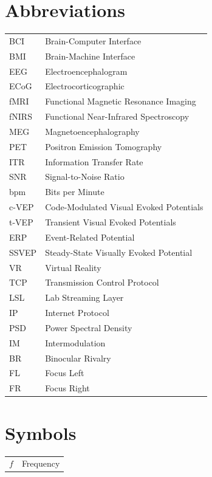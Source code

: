 \documentclass[master=eaict]{kulemt}
\begin{document}
\section*{Abbreviations}
\begin{flushleft}
  \renewcommand{\arraystretch}{1.1}
  \begin{tabularx}{\textwidth}{@{}p{12mm}X@{}}
    BCI & Brain-Computer Interface \\
    BMI & Brain-Machine Interface \\
    EEG & Electroencephalogram \\
    ECoG & Electrocorticographic \\
    fMRI & Functional Magnetic Resonance Imaging \\
    fNIRS & Functional Near-Infrared Spectroscopy \\
    MEG & Magnetoencephalography \\
    PET & Positron Emission Tomography \\
    ITR & Information Transfer Rate \\
    SNR & Signal-to-Noise Ratio \\
    bpm & Bits per Minute \\
    c-VEP & Code-Modulated Visual Evoked Potentials \\
    t-VEP & Transient Visual Evoked Potentials \\
    ERP & Event-Related Potential \\
    SSVEP & Steady-State Visually Evoked Potential \\
    VR & Virtual Reality \\
    TCP   & Transmission Control Protocol \\
    LSL   & Lab Streaming Layer \\
    IP    & Internet Protocol \\
    PSD   & Power Spectral Density \\
    IM & Intermodulation \\
    BR & Binocular Rivalry \\
    FL & Focus Left \\
    FR & Focus Right \\
    
  \end{tabularx}
\end{flushleft}
\section*{Symbols}
\begin{flushleft}
  \renewcommand{\arraystretch}{1.1}
  \begin{tabularx}{\textwidth}{@{}p{12mm}X@{}}
    $f$   & Frequency \\
  \end{tabularx}
\end{flushleft}
\end{document}
